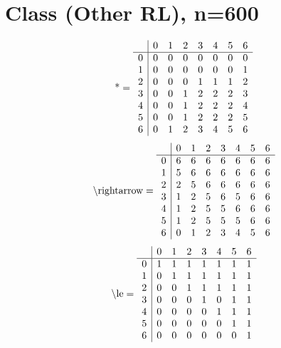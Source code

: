 \documentclass[11pt]{article}
\begin{document}
\section{Class (Other RL), n=600}
\[\text{*} = 
\begin{array}{r | r r r r r r r}
 & 0 & 1 & 2 & 3 & 4 & 5 & 6 \\ \hline
0 & 0 & 0 & 0 & 0 & 0 & 0 & 0 \\
1 & 0 & 0 & 0 & 0 & 0 & 0 & 1 \\
2 & 0 & 0 & 0 & 1 & 1 & 1 & 2 \\
3 & 0 & 0 & 1 & 2 & 2 & 2 & 3 \\
4 & 0 & 0 & 1 & 2 & 2 & 2 & 4 \\
5 & 0 & 0 & 1 & 2 & 2 & 2 & 5 \\
6 & 0 & 1 & 2 & 3 & 4 & 5 & 6 \\
\end{array}
\]
\[\text{\textbackslash rightarrow} = 
\begin{array}{r | r r r r r r r}
 & 0 & 1 & 2 & 3 & 4 & 5 & 6 \\ \hline
0 & 6 & 6 & 6 & 6 & 6 & 6 & 6 \\
1 & 5 & 6 & 6 & 6 & 6 & 6 & 6 \\
2 & 2 & 5 & 6 & 6 & 6 & 6 & 6 \\
3 & 1 & 2 & 5 & 6 & 5 & 6 & 6 \\
4 & 1 & 2 & 5 & 5 & 6 & 6 & 6 \\
5 & 1 & 2 & 5 & 5 & 5 & 6 & 6 \\
6 & 0 & 1 & 2 & 3 & 4 & 5 & 6 \\
\end{array}
\]
\[\text{\textbackslash le} = 
\begin{array}{r | r r r r r r r}
 & 0 & 1 & 2 & 3 & 4 & 5 & 6 \\ \hline
0 & 1 & 1 & 1 & 1 & 1 & 1 & 1 \\
1 & 0 & 1 & 1 & 1 & 1 & 1 & 1 \\
2 & 0 & 0 & 1 & 1 & 1 & 1 & 1 \\
3 & 0 & 0 & 0 & 1 & 0 & 1 & 1 \\
4 & 0 & 0 & 0 & 0 & 1 & 1 & 1 \\
5 & 0 & 0 & 0 & 0 & 0 & 1 & 1 \\
6 & 0 & 0 & 0 & 0 & 0 & 0 & 1 \\
\end{array}
\]
\end{document}
